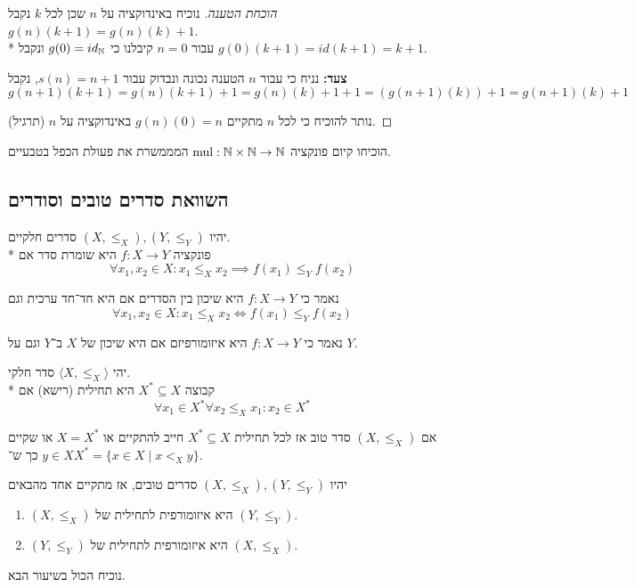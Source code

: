\begin{proof}[הוכחת הטענה]
	נוכיח באינדוקציה על $n$ שכן לכל $k$ נקבל $g(n)(k + 1) = g(n)(k) + 1$. \\*
	עבור $n = 0$ קיבלנו כי $g(0) = id_{\mathbb{N}}$ ונקבל $g(0)(k + 1) = id(k + 1) = k + 1$.

	\textbf{צעד:}
	נניח כי עבור $n$ הטענה נכונה ונבדוק עבור $s(n) = n + 1$, נקבל
	\[
		g(n + 1)(k + 1) = g(n)(k + 1) + 1 = g(n)(k) + 1 + 1 = (g(n + 1)(k)) + 1 = g(n + 1)(k) + 1
	\]

	נותר להוכיח כי לכל $n$ מתקיים $g(n)(0) = n$ באינדוקציה על $n$ (תרגיל).
\end{proof}
\begin{exercise}
	הוכיחו קיום פונקציה $\text{mul} : \mathbb{N} \times \mathbb{N} \to \mathbb{N}$ המממשרת את פעולת הכפל בטבעיים.
\end{exercise}

\subsection{השוואת סדרים טובים וסודרים}
\begin{definition}
	יהיו $(X, \le_X), (Y, \le_Y)$ סדרים חלקיים. \\*
	פונקציה $f : X \to Y$ היא שומרת סדר אם
	\[
		\forall x_1, x_2 \in X : x_1 \le_X x_2 \implies f(x_1) \le_Y f(x_2)
	\]
\end{definition}
\begin{definition}[שיכון]
	נאמר כי $f : X \to Y$ היא שיכון בין הסדרים אם היא חד־חד ערכית וגם
	\[
		\forall x_1, x_2 \in X : x_1 \le_X x_2 \iff f(x_1) \le_Y f(x_2)
	\]
\end{definition}
\begin{definition}[איזומורפיזם]
	נאמר כי $f : X \to Y$ היא איזומורפיזם אם היא שיכון של $X$ ב־$Y$ וגם על $Y$.
\end{definition}
\begin{definition}
	יהי $\langle X, \le_X \rangle$ סדר חלקי. \\*
	קבוצה $X^* \subseteq X$ היא תחילית (רישא) אם
	\[
		\forall x_1 \in X^* \forall x_2 \le_X x_1 : x_2 \in X^*
	\]
\end{definition}
\begin{proposition}
	אם $(X, \le_X)$ סדר טוב אז לכל תחילית $X^* \subseteq X$ חייב להתקיים או $X = X^*$ או שקיים $y \in X$ כך ש־$X^* = \{ x \in X \mid x <_X y \}$.
\end{proposition}
\begin{theorem}
	יהיו $(X, \le_X), (Y, \le_Y)$ סדרים טובים, אז מתקיים אחד מהבאים
	\begin{enumerate}
		\item $(X, \le_X)$ היא איזומורפית לתחילית של $(Y, \le_Y)$.
		\item $(Y, \le_Y)$ היא איזומורפית לתחילית של $(X, \le_X)$.
	\end{enumerate}
\end{theorem}
נוכיח הכול בשיעור הבא.


